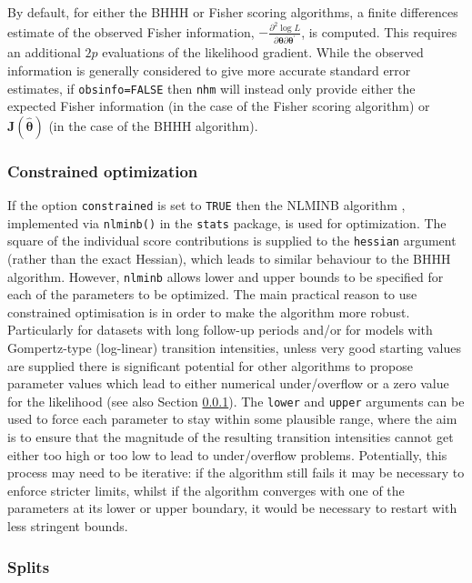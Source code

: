 \documentclass{article}
\numberwithin{equation}{section}
\begin{document}
By default, for either the BHHH or Fisher scoring algorithms, a finite differences estimate of the observed Fisher information, $-\frac{\partial^2 \log L}{\partial \bm\theta\partial \bm\theta^{'}}$, is computed. This requires an additional $2p$ evaluations of the likelihood gradient. While the observed information is generally considered to give more accurate standard error estimates, if \verb!obsinfo=FALSE! then \verb!nhm! will instead only provide either the expected Fisher information (in the case of the Fisher scoring algorithm) or $\mathbf{J}(\hat{\bm\theta})$ (in the case of the BHHH algorithm). 

\subsubsection*{Constrained optimization}

If the option \verb!constrained! is set to \verb!TRUE! then the NLMINB algorithm \cite{gay}, implemented via \verb!nlminb()! in the \verb!stats! package, is used for optimization. The square of the individual score contributions is supplied to the \verb!hessian! argument (rather than the exact Hessian), which leads to similar behaviour to the BHHH algorithm. However, \verb!nlminb! allows lower and upper bounds to be specified for each of the parameters to be optimized. The main practical reason to use constrained optimisation is in order to make the algorithm more robust. Particularly for datasets with long follow-up periods and/or for models with Gompertz-type (log-linear) transition intensities, unless very good starting values are supplied there is significant potential for other algorithms to propose parameter values which lead to either numerical under/overflow or a zero value for the likelihood (see also Section \ref{splits_sec}). The \verb!lower! and \verb!upper! arguments can be used to force each parameter to stay within some plausible range, where the aim is to ensure that the magnitude of the resulting transition intensities cannot get either too high or too low to lead to under/overflow problems. Potentially, this process may need to be iterative: if the algorithm still fails it may be necessary to enforce stricter limits, whilst if the algorithm converges with one of the parameters at its lower or upper boundary, it would be necessary to restart with less stringent bounds.

\subsubsection{Splits}
\label{splits_sec}
\end{document}
